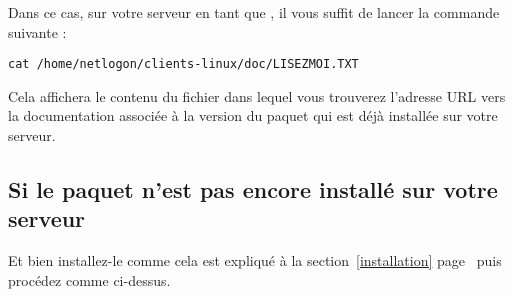 \documentclass[french,a4paper,12pt]{article}
\begin{document}
Dans ce cas, sur votre serveur en tant que ,
il vous suffit de lancer la commande suivante :
%
\begin{lstlisting}
cat /home/netlogon/clients-linux/doc/LISEZMOI.TXT
\end{lstlisting}
%
Cela affichera le contenu du fichier  dans
lequel vous trouverez l'adresse URL vers la documentation associée à la version
du paquet qui est déjà installée sur votre serveur.


\subsection{Si le paquet n'est pas encore installé sur votre serveur}

Et bien installez-le comme cela est expliqué à la section~\ref{installation}
page~\pageref{installation} puis procédez comme ci-dessus.




\end{document}
